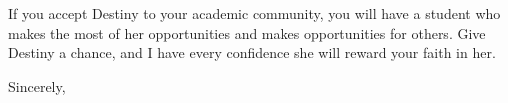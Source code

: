 \documentclass[11pt, letterpaper]{letter} %
\begin{document}
\begin{letter}
If you accept Destiny to your academic community, you will have a student who makes the most of her opportunities and makes opportunities for others. Give Destiny a chance, and I have every confidence she will reward your faith in her.

\closing{Sincerely,}




\end{letter}
\end{document}
